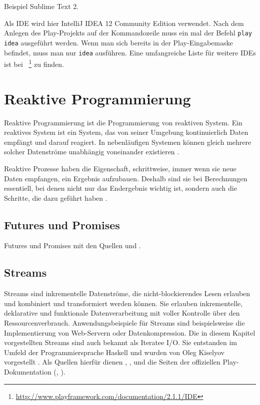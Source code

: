 \documentclass[draft=false
              ,paper=a4
              ,twoside=false
              ,fontsize=11pt
              ,headsepline
              ,BCOR10mm
              ,DIV11
              ]{scrbook}
\begin{document}
Beispiel Sublime Text 2.

Als IDE wird hier IntelliJ IDEA 12 Community Edition verwendet.
Nach dem Anlegen des Play-Projekts auf der Kommandozeile muss ein mal der Befehl \lstinline|play idea| ausgeführt werden.
Wenn man sich bereits in der Play-Eingabemaske befindet, muss man nur \lstinline|idea| ausführen.
Eine umfangreiche Liste für weitere IDEs ist bei \citealt{ide}~\footnote{\url{http://www.playframework.com/documentation/2.1.1/IDE}} zu finden.








\chapter{Reaktive Programmierung} %
\label{cha:reaktive_programmierung}

Reaktive Programmierung ist die Programmierung von reaktiven System.
Ein reaktives System ist ein System, das von seiner Umgebung kontinuierlich Daten empfängt und darauf reagiert.
In nebenläufigen Systemen können gleich mehrere solcher Datenströme unabhängig voneinander existieren \cite[vgl.][S.~1]{reactive_programming}.

Reaktive Prozesse haben die Eigenschaft, schrittweise, immer wenn sie neue Daten empfangen, ein Ergebnis aufzubauen.
Deshalb sind sie bei Berechnungen essentiell, bei denen nicht nur das Endergebnis wichtig ist, sondern auch die Schritte, die dazu geführt haben \cite[vgl.][S.~2]{reactive_programming1}.


\section{Futures und Promises} %
\label{sec:futures_und_promises}

Futures und Promises mit den Quellen \citealt{haller2013} und \citealt{typesafe2013}.



\section{Streams} %
\label{sec:streams}

Streams sind inkrementelle Datenströme, die nicht-blockierendes Lesen erlauben und kombiniert und transformiert werden können.
Sie erlauben inkrementelle, deklarative und funktionale Datenverarbeitung mit voller Kontrolle über den Ressourcenverbrauch.
Anwendungsbeispiele für Streams sind beispielsweise die Implementierung von Web-Servern oder Datenkompression.
Die in diesem Kapitel vorgestellten Streams sind auch bekannt als Iteratee I/O.
Sie entstanden im Umfeld der Programmiersprache Haskell und wurden von Oleg Kiselyov vorgestellt \cite[vgl.][S.~19]{monad_reader}.
Als Quellen hierfür dienen \citealt{kiselyov2012}, \citealt{iteratee_io}, \citealt{monad_reader} und die Seiten der offiziellen Play-Dokumentation (\citealt{iteratees}, \cite{enumerators}).
\end{document}
